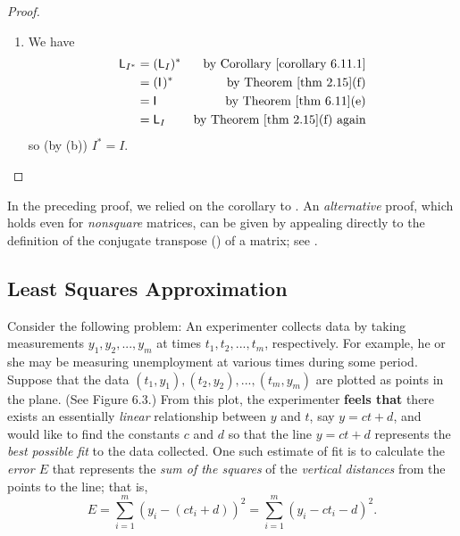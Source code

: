 \begin{proof}
\begin{enumerate}
\item We have
\begin{align*}
    \LMTRAN_{I^*}
        & = (\LMTRAN_I)^* & \text{by \CORO{6.11.1}} \\
        & = (\ITRAN{})^* & \text{by \THM{2.15}(f)} \\
        & = \ITRAN{} & \text{by \THM{6.11}(e)} \\
        & = \LMTRAN_I & \text{by \THM{2.15}(f) again}
\end{align*}
so (by (b)) \(I^* = I\).
\end{enumerate}
\end{proof}

\begin{remark} \label{remark 6.3.5}
In the preceding proof, we relied on the corollary to .
An \emph{alternative} proof, which holds even for \emph{nonsquare} matrices, can be given by appealing directly to the definition of the conjugate transpose () of a matrix; see .
\end{remark}

\subsection{Least Squares Approximation} \label{sec 6.3.1}

\sloppy Consider the following problem: An experimenter collects data by taking measurements \(y_1, y_2, ..., y_m\) at times \(t_1, t_2, ..., t_m\), respectively.
For example, he or she may be measuring unemployment at various times during some period.
Suppose that the data \((t_1, y_1), (t_2, y_2), ..., (t_m, y_m)\) are plotted as points in the plane.
(See Figure 6.3.)
From this plot, the experimenter \textbf{feels that} there exists an essentially \emph{linear} relationship between \(y\) and \(t\), say \(y = ct + d\), and would like to find the constants \(c\) and \(d\) so that the line \(y = ct + d\) represents the \emph{best possible fit} to the data collected.
One such estimate of fit is to calculate the \emph{error \(E\)} that represents the \emph{sum of the squares} of the \emph{vertical distances} from the points to the line; that is,
\[
    E = \sum_{i = 1}^m (y_i - (ct_i + d))^2 = \sum_{i = 1}^m (y_i - ct_i - d)^2.
\]


